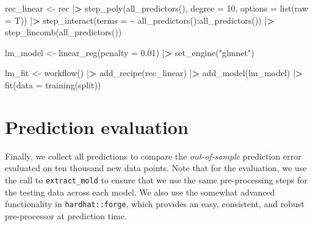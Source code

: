 \documentclass[
]{book}
\newenvironment{Shaded}{\begin{snugshade}}{\end{snugshade}}
\newcommand{\AttributeTok}[1]{\textcolor[rgb]{0.61,0.61,0.61}{#1}}
\newcommand{\DecValTok}[1]{\textcolor[rgb]{0.06,0.06,0.06}{#1}}
\newcommand{\ErrorTok}[1]{\textcolor[rgb]{0.14,0.14,0.14}{\textbf{#1}}}
\newcommand{\FloatTok}[1]{\textcolor[rgb]{0.06,0.06,0.06}{#1}}
\newcommand{\FunctionTok}[1]{\textcolor[rgb]{0,0,0}{#1}}
\newcommand{\NormalTok}[1]{#1}
\newcommand{\OtherTok}[1]{\textcolor[rgb]{0.37,0.37,0.37}{#1}}
\newcommand{\SpecialCharTok}[1]{\textcolor[rgb]{0,0,0}{#1}}
\newcommand{\StringTok}[1]{\textcolor[rgb]{0.5,0.5,0.5}{#1}}
\begin{document}
\begin{Shaded}
\begin{Highlighting}[]
\NormalTok{rec\_linear }\OtherTok{\textless{}{-}}\NormalTok{ rec }\SpecialCharTok{|}\ErrorTok{\textgreater{}}
  \FunctionTok{step\_poly}\NormalTok{(}\FunctionTok{all\_predictors}\NormalTok{(),}
            \AttributeTok{degree =} \DecValTok{10}\NormalTok{, }
            \AttributeTok{options =} \FunctionTok{list}\NormalTok{(}\AttributeTok{raw =}\NormalTok{ T)) }\SpecialCharTok{|}\ErrorTok{\textgreater{}}
  \FunctionTok{step\_interact}\NormalTok{(}\AttributeTok{terms =} \SpecialCharTok{\textasciitilde{}} \FunctionTok{all\_predictors}\NormalTok{()}\SpecialCharTok{:}\FunctionTok{all\_predictors}\NormalTok{()) }\SpecialCharTok{|}\ErrorTok{\textgreater{}}
  \FunctionTok{step\_lincomb}\NormalTok{(}\FunctionTok{all\_predictors}\NormalTok{())}

\NormalTok{lm\_model }\OtherTok{\textless{}{-}} \FunctionTok{linear\_reg}\NormalTok{(}\AttributeTok{penalty =} \FloatTok{0.01}\NormalTok{) }\SpecialCharTok{|}\ErrorTok{\textgreater{}}
  \FunctionTok{set\_engine}\NormalTok{(}\StringTok{"glmnet"}\NormalTok{)}

\NormalTok{lm\_fit }\OtherTok{\textless{}{-}} \FunctionTok{workflow}\NormalTok{() }\SpecialCharTok{|}\ErrorTok{\textgreater{}}
  \FunctionTok{add\_recipe}\NormalTok{(rec\_linear) }\SpecialCharTok{|}\ErrorTok{\textgreater{}}
  \FunctionTok{add\_model}\NormalTok{(lm\_model) }\SpecialCharTok{|}\ErrorTok{\textgreater{}}
  \FunctionTok{fit}\NormalTok{(}\AttributeTok{data =} \FunctionTok{training}\NormalTok{(split))}
\end{Highlighting}
\end{Shaded}

\hypertarget{prediction-evaluation}{%
\section{Prediction evaluation}\label{prediction-evaluation}}

Finally, we collect all predictions to compare the \emph{out-of-sample} prediction error evaluated on ten thousand new data points. Note that for the evaluation, we use the call to \texttt{extract\_mold} to ensure that we use the same pre-processing steps for the testing data across each model. We also use the somewhat advanced functionality in \texttt{hardhat::forge}, which provides an easy, consistent, and robust pre-processor at prediction time.
\end{document}
